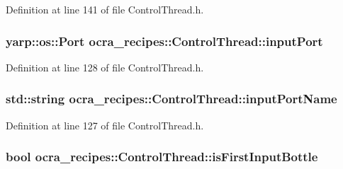 Definition at line 141 of file Control\+Thread.\+h.

\subsubsection[{\texorpdfstring{input\+Port}{inputPort}}]{\setlength{\rightskip}{0pt plus 5cm}yarp\+::os\+::\+Port ocra\+\_\+recipes\+::\+Control\+Thread\+::input\+Port\hspace{0.3cm}{\ttfamily [protected]}}\hypertarget{classocra__recipes_1_1ControlThread_a3c6a392da512677af0b6c20f5ed357c1}{}\label{classocra__recipes_1_1ControlThread_a3c6a392da512677af0b6c20f5ed357c1}


Definition at line 128 of file Control\+Thread.\+h.

\subsubsection[{\texorpdfstring{input\+Port\+Name}{inputPortName}}]{\setlength{\rightskip}{0pt plus 5cm}std\+::string ocra\+\_\+recipes\+::\+Control\+Thread\+::input\+Port\+Name\hspace{0.3cm}{\ttfamily [protected]}}\hypertarget{classocra__recipes_1_1ControlThread_a4979cfd87cd758473a2ec367f47be17f}{}\label{classocra__recipes_1_1ControlThread_a4979cfd87cd758473a2ec367f47be17f}


Definition at line 127 of file Control\+Thread.\+h.

\subsubsection[{\texorpdfstring{is\+First\+Input\+Bottle}{isFirstInputBottle}}]{\setlength{\rightskip}{0pt plus 5cm}bool ocra\+\_\+recipes\+::\+Control\+Thread\+::is\+First\+Input\+Bottle\hspace{0.3cm}{\ttfamily [protected]}}\hypertarget{classocra__recipes_1_1ControlThread_ae459f7c503830d9ae1c0015d8613ea87}{}\label{classocra__recipes_1_1ControlThread_ae459f7c503830d9ae1c0015d8613ea87}


